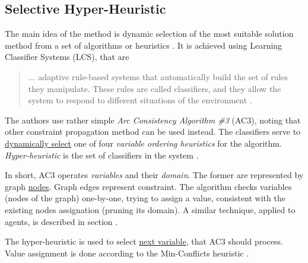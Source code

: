 \documentclass[../header]{subfiles}
\begin{document}
\providecommand{\rootdir}{..}



\subsection{Selective Hyper-Heuristic}
The main idea of the method is dynamic selection of the most suitable solution method
from a set of algorithms or heuristics \cite{CSPhypHeur}. It is achieved
using Learning Classifier Systems (LCS), that are
\begin{quote}
  $\dots$ adaptive rule-based systems that automatically build the set of rules
  they manipulate. These rules are called classifiers, and they
  allow the system to respond to different situations of the
  environment \cite{CSPhypHeur}.
\end{quote}

The authors use rather simple \emph{Arc Consistency Algorithm \#3} (AC3), noting
that other constraint propagation method can be used instead.
The classifiers serve to \underline{dynamically select} one of four
\emph{variable ordering heuristics} for the algorithm.
\emph{Hyper-heuristic} is the set of classifiers in the system \cite{CSPhypHeur}.

In short, AC3 operates \emph{variables} and their \emph{domain}. The former are
represented by graph \underline{nodes}. Graph edges represent constraint. The
algorithm checks variables (nodes of the graph) one-by-one, trying to assign a value,
consistent with the existing nodes assignation (pruning its domain).
A similar technique, applied to agents, is described in section \label{sec:CSP-Agents}.

The hyper-heuristic is used to select \underline{next variable}, that AC3 should
process. Value assignment is done according to the Min-Conflicts heuristic \cite{CSPhypHeur}.
\end{document}
